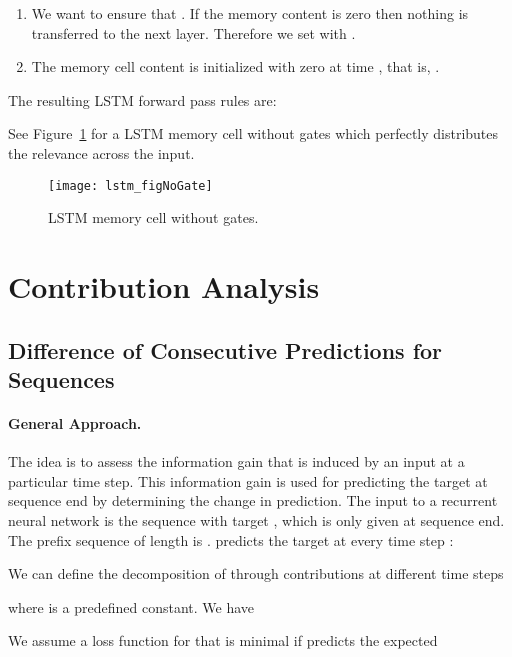 \documentclass{article}
\begin{document}
\begin{appendices}
\begin{enumerate}[label=\textbf{(A\arabic*)}]
\item We want to ensure that . If the memory content is zero
  then nothing is transferred to the next layer.
  Therefore we set  with .

\item The memory cell content is initialized with zero at time ,
  that is, . 
 
\end{enumerate}

The resulting LSTM forward pass rules are:

See Figure~\ref{fig:cellLRPNoGate} for a LSTM memory cell without
gates which perfectly distributes the relevance across the input.


\begin{figure}[htb]
\centering
\texttt{[image: lstm\_figNoGate]}
\caption{LSTM memory cell without gates. 
\label{fig:cellLRPNoGate}}
\end{figure}

\clearpage


\pagebreak

\section{Contribution Analysis}
\label{sec:Aback}

\subsection{Difference of Consecutive Predictions for Sequences}

\paragraph{General Approach.}

The idea is to assess the information gain that is induced by an input at a particular time step. This information gain is used for predicting the target at sequence end
by determining the change in prediction.
The input to a recurrent neural network is the sequence
 with target , which is only given at
sequence end.
The prefix sequence  of length  is .
 predicts the target  at every time step :
 
We can define the decomposition of  through contributions at different time steps
 
where  is a predefined constant.
We have
 

We assume a loss function for  that is minimal if  predicts the expected


\end{appendices}
\end{document}
